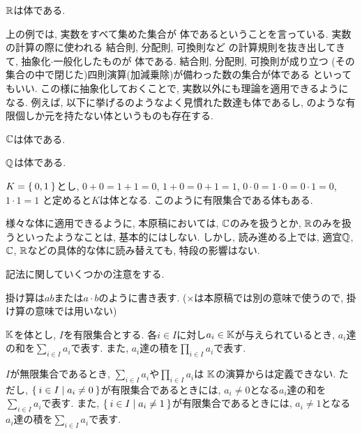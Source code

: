 \begin{example}
  $\mathbb{R}$は体である.
\end{example}

上の例では,
実数をすべて集めた集合が
体であるということを言っている.
実数の計算の際に使われる
結合則, 分配則, 可換則など
の計算規則を抜き出してきて,
抽象化$\cdot$一般化したものが
体である.
結合則, 分配則, 可換則が成り立つ
(その集合の中で閉じた)四則演算(加減乗除)が備わった数の集合が体である
といってもいい.
この様に抽象化しておくことで,
実数以外にも理論を適用できるようになる.
例えば, 以下に挙げるのようなよく見慣れた数達も体であるし,
のような有限個しか元を持たない体というものも存在する.
\begin{example}
\label{ex:cc}
  $\mathbb{C}$は体である.
\end{example}
\begin{example}
\label{ex:qq}
  $\mathbb{Q}$は体である.
\end{example}
\begin{example}
\label{ex:f2}
$K=\Set{0,1}$とし,
$0+0=1+1=0$, $1+0=0+1=1$,
$0\cdot 0=1\cdot 0=0\cdot 1=0$, $1\cdot 1=1$
と定めると$K$は体となる.
このように有限集合である体もある.
\end{example}

様々な体に適用できるように,
本原稿においては,
$\mathbb{C}$のみを扱うとか,
$\mathbb{R}$のみを扱うといったようなことは,
基本的にはしない.
しかし,
読み進める上では,
適宜$\mathbb{Q}$, $\mathbb{C}$, $\mathbb{R}$などの具体的な体に読み替えても,
特段の影響はない.




記法に関していくつかの注意をする.
\begin{remark}
  掛け算は$ab$または$a\cdot b$のように書き表す.
  ($\times$は本原稿では別の意味で使うので,
  掛け算の意味では用いない)
\end{remark}


$\mathbb{K}$を体とし,
$I$を有限集合とする.
各$i\in I$に対し$a_i\in \mathbb{K}$が与えられているとき,
$a_i$達の和を$\sum_{i\in I} a_i$で表す.
また,
$a_i$達の積を$\prod_{i\in I} a_i$で表す.

\begin{remark}
$I$が無限集合であるとき,
$\sum_{i\in I} a_i$や$\prod_{i\in I} a_i$は
$\mathbb{K}$の演算からは定義できない.
ただし,
$\Set{i \in I |a_i\neq 0}$が有限集合であるときには,
$a_i\neq 0$となる$a_i$達の和を$\sum_{i\in I} a_i$で表す.
また,
$\Set{i \in I |a_i\neq 1}$が有限集合であるときには,
$a_i\neq 1$となる$a_i$達の積を$\sum_{i\in I} a_i$で表す.
\end{remark}


